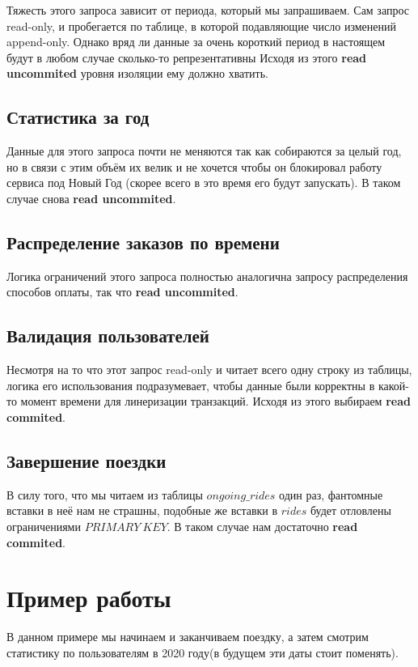 \documentclass[fontsize=12pt]{article}
\begin{document}
Тяжесть этого запроса зависит от периода, который мы запрашиваем. Сам запрос read-only, и пробегается по таблице, в которой подавляющие число изменений append-only. Однако вряд ли данные за очень короткий период в настоящем будут в любом случае сколько-то репрезентативны Исходя из этого \textbf{read uncommited} уровня изоляции ему должно хватить.

\subsection*{Статистика за год}

Данные для этого запроса почти не меняются так как собираются за целый год, но в связи с этим объём их велик и не хочется чтобы он блокировал работу сервиса под Новый Год (скорее всего в это время его будут запускать). В таком случае снова \textbf{read uncommited}.

\subsection*{Распределение заказов по времени}

Логика ограничений этого запроса полностью аналогична запросу распределения способов оплаты, так что \textbf{read uncommited}.

\subsection*{Валидация пользователей}

Несмотря на то что этот запрос read-only и читает всего одну строку из таблицы, логика его использования подразумевает, чтобы данные были корректны в какой-то момент времени для линеризации транзакций. Исходя из этого выбираем \textbf{read commited}.

\subsection*{Завершение поездки}

В силу того, что мы читаем из таблицы $ongoing\_rides$ один раз, фантомные вставки в неё нам не страшны, подобные же вставки в $rides$ будет отловлены ограничениями $PRIMARY\ KEY$. В таком случае нам достаточно \textbf{read commited}.

\section{Пример работы}

В данном примере мы начинаем и заканчиваем поездку, а затем смотрим статистику по пользователям в 2020 году(в будущем эти даты стоит поменять).

\inputminted[frame=single]{sql}{scripts/examples.sql}
\end{document}
